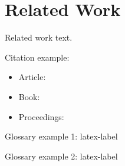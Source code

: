 \section{Related Work}\label{sec:related-work}

Related work text.


Citation example:

\begin{itemize}
	\item Article: \cite{ArticleAuthorYear}
	\item Book: \cite{BookAuthorYear}
	\item Proceedings: \cite{ProceedingsAuthorYear}
\end{itemize}


Glossary example 1: \gls{latex-label}

Glossary example 2: \gls{latex-label}

